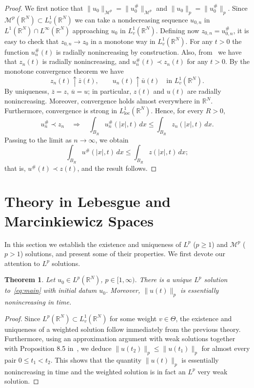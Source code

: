 \documentclass[leqno,12pt]{amsart}
\newtheorem{theorem}{Theorem}[section]
\theoremstyle{definition}
\theoremstyle{remark}
\numberwithin{equation}{section}
\begin{document}
\begin{proof} We first notice that $\|u_0\|_{\mathcal{M}^p}=\|u^\#_0\|_{\mathcal{M}^p}$ and $\|u_0\|_{p}=\|u^\#_0\|_{p}$. 
Since $\mathcal{M}^p(\mathbb{R}^N)\subset L^1_v(\mathbb{R}^N)$ we can take a nondecreasing sequence $u_{0,n}$ in
$L^{1}(\mathbb{R}^N)\cap L^{\infty}(\mathbb{R}^N)$ approaching $u_0$ in $L^1_v(\mathbb{R}^N)$. Defining now $z_{0,n}=u_{0,n}^{\#}$, it is easy to check that $z_{0,n}\to z_0$ in a monotone way in $L^1_v(\mathbb{R}^N)$. For any $t>0$ the function \(u^{\#}_n(t)\) is radially nonincreasing by construction. Also, from~\cite{volzone} we have that \(z_n(t)\) is radially nonincreasing, and  $u_n^{\#}(t)\prec z_n(t)$ for any $t>0$. By the monotone convergence theorem we have
$$
z_n(t)\uparrow \bar{z}(t),\qquad
u_n(t)\uparrow \bar{u}(t)
\quad\text{in }L^1_v(\mathbb{R}^N).
$$
By uniqueness,  $\overline{z}=z$, $\overline{u}=u$; in particular, \(z(t)\) and \(u(t)\) are radially nonincreasing. Moreover, convergence holds almost everywhere in \(\mathbb{R}^N\). Furthermore, convergence is strong in \(L^1_{\mathrm{loc}}(\mathbb{R}^N)\). Hence, for every \(R>0\),
\[
u_n^{\#}\prec z_n
\quad\Longrightarrow\quad
\int_{B_R}u_n^{\#}(|x|,t)\,dx
\le
\int_{B_R}z_n(|x|,t)\,dx.
\]
Passing to the limit as \(n\to\infty\), we obtain
\[
\int_{B_R}u^{\#}(|x|,t)\,dx
\le
\int_{B_R}z(|x|,t)\,dx;
\]
that is, $u^{\#}(t)\prec z(t)$, and the result follows. 
\end{proof}


\section{Theory in Lebesgue and Marcinkiewicz Spaces}\label{sec:theory in Lebesgues sp}

In this section we establish the existence and uniqueness of $L^p$ ($p\ge1$) and $\mathcal{M}^p$  ($p>1$) solutions, and present some of their properties. We first devote our attention to $L^p$ solutions.

\begin{theorem}\label{solution in Lp}
    Let $u_0\in L^p(\mathbb{R}^N)$, $p\in[1,\infty)$. There is a unique $L^p$ solution to~\eqref{eq:main} with initial datum $u_0$.  Moreover, $\|u(t)\|_p$ is essentially nonincreasing in time. 
\end{theorem}

\begin{proof}
Since $L^p(\mathbb{R}^N)\subset L^1_v(\mathbb{R}^N)$ for some weight $v\in \Theta$, the existence and uniqueness of a weighted solution follow immediately from the previous theory. 
Furthermore, using an approximation argument with weak solutions together with Proposition 8.5 in~\cite{b1}, we deduce $\|u(t_2)\|_p\le \|u(t_1)\|_p$ for almost every pair $0\le t_1<t_2$. This shows that the quantity $\|u(t)\|_p$ is essentially nonincreasing in time and the weighted solution is in fact an $L^p$ very weak solution.
\end{proof}
\end{document}
